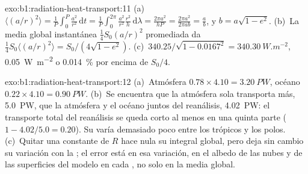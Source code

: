 \begin{solution}{exo:b1:radiation-heat-transport:11}
(a)~$\langle (a/r)^2\rangle = \frac1P\int_0^P \frac{a^2}{r^2}\,\mathrm dt =
\frac1P\int_0^{2\pi}\frac{a^2}{r^2}\frac{r^2}{h}\,\mathrm d\lambda = \frac{2\pi
a^2}{hP} = \frac{2\pi a^2}{2\pi a b} = \frac ab$, y $b = a\sqrt{1-e^2}$.
(b)~La media global instantánea $\frac14 S_0(a/r)^2$ promediada da $\frac14 S_0
\langle(a/r)^2\rangle = S_0/(4\sqrt{1-e^2})$. (c)~$340.25/\sqrt{1 - 0.0167^2} =
\qty{340.30}{W.m^{-2}}$, \qty{0.05}{W.m^{-2}} o \qty{0.014}{\percent} por encima de
$S_0/4$.
\end{solution}

\begin{solution}{exo:b1:radiation-heat-transport:12}
(a)~Atmósfera $0.78 \times 4.10 = \qty{3.20}{PW}$, océano $0.22 \times 4.10 =
\qty{0.90}{PW}$. (b)~Se encuentra que la atmósfera sola transporta más, \qty{5.0}{PW}, que la atmósfera y el océano juntos del reanálisis, \qty{4.02}{PW}: el transporte total del reanálisis se queda corto al menos en una quinta parte ($1 - 4.02/5.0 = 0.20$).
Su  varía demasiado poco entre los trópicos y los polos. (c)~Quitar una constante de $R$ hace nula su integral global, pero deja sin cambio su variación con la ; el error está en esa variación, en el albedo de las nubes y de las superficies del modelo en cada , no solo en la media global.
\end{solution}

